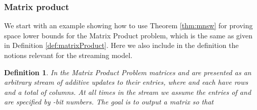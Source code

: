 \documentclass[11pt]{article}
\newtheorem{definition}[theorem]{Definition}
\begin{document}
\subsubsection{Matrix product}
We start with an example showing how to use Theorem \ref{thm:mnsw} for proving
space lower bounds for the {\sf Matrix Product} problem, which is the same
as given in Definition \ref{def:matrixProduct}. Here we also include in the definition
the notions relevant for the streaming model.

\begin{definition}\label{def:matrixProduct2}
In the {\em Matrix Product} Problem matrices  and  are presented as an arbitrary stream of
additive updates to their entries, where  and  each have  rows and a 
total of  columns.  At all times in the stream we assume the entries of  and 
are specified by -bit numbers.
The goal is to output a 
matrix  so that 

\end{definition}
\end{document}
